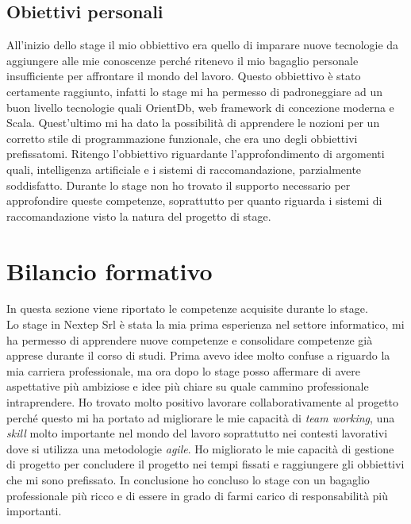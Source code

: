 \subsection{Obiettivi personali}
All'inizio dello stage il mio obbiettivo era quello di imparare nuove tecnologie da aggiungere alle mie conoscenze perché ritenevo il mio bagaglio personale insufficiente per affrontare il mondo del lavoro. Questo obbiettivo è stato certamente raggiunto, infatti lo stage mi ha permesso di padroneggiare ad un buon livello tecnologie quali OrientDb, web framework di concezione moderna e Scala. Quest'ultimo mi ha dato la possibilità di apprendere le nozioni per un corretto stile di programmazione funzionale, che era uno degli obbiettivi prefissatomi. Ritengo l'obbiettivo riguardante l'approfondimento di argomenti quali, intelligenza artificiale e i sistemi di raccomandazione, parzialmente soddisfatto. Durante lo stage non ho trovato il supporto necessario per approfondire queste competenze, soprattutto per quanto riguarda i sistemi di raccomandazione visto la natura del progetto di stage.




\section{Bilancio formativo}
In questa sezione viene riportato le competenze acquisite durante lo stage.\\
Lo stage in Nextep Srl è stata la  mia prima esperienza nel settore informatico, mi ha permesso di apprendere nuove competenze e consolidare competenze già apprese durante il corso di studi. Prima avevo idee molto confuse a riguardo la mia carriera professionale, ma ora dopo lo stage posso affermare di avere aspettative più ambiziose e idee più chiare su quale cammino professionale intraprendere. Ho trovato molto positivo lavorare collaborativamente al progetto perché questo mi ha portato ad migliorare le mie capacità di \emph{team working}, una \emph{skill} molto importante nel mondo del lavoro soprattutto nei contesti lavorativi dove si utilizza una metodologie \emph{agile}. Ho migliorato le mie capacità di gestione di progetto per concludere il progetto nei tempi fissati e raggiungere gli obbiettivi che mi sono prefissato. In conclusione ho concluso lo stage con un bagaglio professionale più ricco e di essere in grado di farmi carico di responsabilità più importanti.
